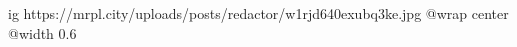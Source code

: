  
 
 
 
 

\ifcmt
  ig https://mrpl.city/uploads/posts/redactor/w1rjd640exubq3ke.jpg
  @wrap center
  @width 0.6
\fi
